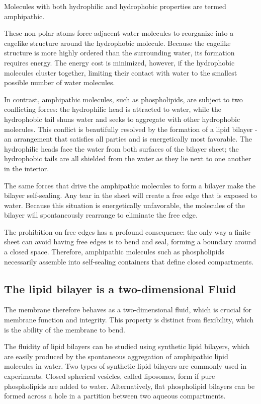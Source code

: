 Molecules with both hydrophilic and hydrophobic properties are termed
amphipathic.

These non-polar atoms force adjacent water molecules to reorganize into a cagelike
structure around the hydrophobic molecule. Because the
cagelike structure is more highly ordered than the surrounding water,
its formation requires energy. The energy cost is minimized, however, if
the hydrophobic molecules cluster together, limiting their contact with
water to the smallest possible number of water molecules.

In contrast, amphipathic molecules, such as phospholipids, are subject to two conflicting forces: the hydrophilic head is
attracted to water, while the hydrophobic tail shuns water and seeks to
aggregate with other hydrophobic molecules. This conflict is beautifully
resolved by the formation of a lipid bilayer - an arrangement that satisfies 
all parties and is energetically most favorable. The hydrophilic heads
face the water from both surfaces of the bilayer sheet; the hydrophobic
tails are all shielded from the water as they lie next to one another in the
interior.

The same forces that drive the amphipathic molecules to form a bilayer
make the bilayer self-sealing. Any tear in the sheet will create a free edge
that is exposed to water. Because this situation is energetically unfavorable,
the molecules of the bilayer will spontaneously rearrange to eliminate
the free edge.

The prohibition on free edges has a profound consequence: the only way
a finite sheet can avoid having free edges is to bend and seal, forming a
boundary around a closed space. Therefore, amphipathic
molecules such as phospholipids necessarily assemble into self-sealing
containers that define closed compartments.

\subsection{The lipid bilayer is a two-dimensional Fluid}

The membrane therefore behaves as a two-dimensional fluid, which is crucial for membrane function and integrity. 
This property is distinct from flexibility, which is the ability of
the membrane to bend.

The fluidity of lipid bilayers can be studied using synthetic lipid bilayers,
which are easily produced by the spontaneous aggregation of amphipathic 
lipid molecules in water. Two types of synthetic lipid bilayers are
commonly used in experiments. Closed spherical vesicles, called liposomes, 
form if pure phospholipids are added to water. Alternatively, flat
phospholipid bilayers can be formed across a hole in a partition between
two aqueous compartments.

